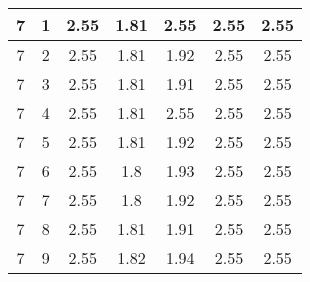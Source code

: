 \begin{longtable}{|c|c||c||c|c||c|c|}
	7 & 1 & 2.55 & 1.81 & 2.55 & 2.55 & 2.55 \\ \hline
	7 & 2 & 2.55 & 1.81 & 1.92 & 2.55 & 2.55 \\ \hline
	7 & 3 & 2.55 & 1.81 & 1.91 & 2.55 & 2.55 \\ \hline
	7 & 4 & 2.55 & 1.81 & 2.55 & 2.55 & 2.55 \\ \hline
	7 & 5 & 2.55 & 1.81 & 1.92 & 2.55 & 2.55 \\ \hline
	7 & 6 & 2.55 & 1.8 & 1.93 & 2.55 & 2.55 \\ \hline
	7 & 7 & 2.55 & 1.8 & 1.92 & 2.55 & 2.55 \\ \hline
	7 & 8 & 2.55 & 1.81 & 1.91 & 2.55 & 2.55 \\ \hline
	7 & 9 & 2.55 & 1.82 & 1.94 & 2.55 & 2.55 \\ \hline
\end{longtable}
\clearpage{}
